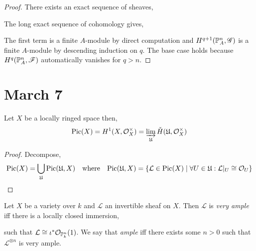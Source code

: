 \documentclass[12pt]{article}
\begin{document}
\begin{proof}
There exists an exact sequence of sheaves,
\begin{center}
\end{center}
The long exact sequence of cohomology gives,
\begin{center}
\end{center}
The first term is a finite $A$-module by direct computation and $H^{q+1}(\mathbb{P}_A^n, \mathscr{G})$ is a finite $A$-module by descending induction on $q$. The base case holds because $H^q(\mathbb{P}_A^n, \mathscr{F})$ automatically vanishes for $q > n$. 
\end{proof}

\section{March 7}


\begin{theorem}
Let $X$ be a locally ringed space then,
\[ \mathrm{Pic}(X) = H^1(X, \mathcal{O}_{X}^\times) = \varinjlim_{\mathfrak{U}} \check{H}(\mathfrak{U}, \mathcal{O}_{X}^\times) \]
\end{theorem}

\begin{proof}
Decompose,
\[ \mathrm{Pic}(X) = \bigcup_{\mathfrak{U}} \mathrm{Pic}(\mathfrak{U}, X) \quad \text{where} \quad \mathrm{Pic}(\mathfrak{U}, X) = \{ \mathcal{L} \in \mathrm{Pic}(X) \mid \forall U \in \mathfrak{U} : \mathcal{L}|_U \cong \mathcal{O}_{U} \} \]
\end{proof}

\begin{definition}
Let $X$ be a variety over $k$ and $\mathcal{L}$ an invertible sheaf on $X$. Then $\mathcal{L}$ is \textit{very ample} iff there is a locally closed immersion,
\begin{center}
\end{center}
such that $\mathcal{L} \cong \iota^* \mathcal{O}_{\mathbb{P}^n_k}(1)$. We say that \textit{ample} iff there exists some $n > 0$ such that $\mathcal{L}^{\otimes n}$ is very ample. 
\end{definition}
\end{document}
